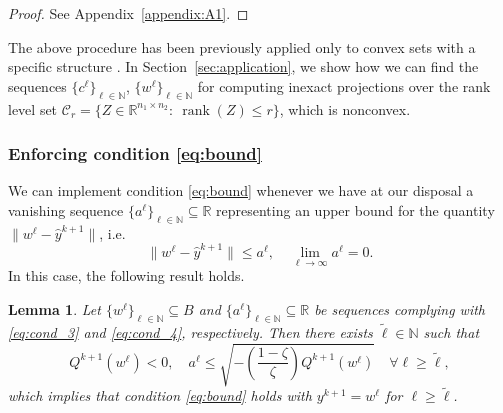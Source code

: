 \documentclass[pdflatex,sn-mathphys-num]{sn-jnl}
\numberwithin{equation}{section}%
\def\R{\mathbb{R}}
\def\N{\mathbb{N}}
\theoremstyle{thmstyleone}%
\newtheorem{lemma}[theorem]{Lemma}%
\theoremstyle{thmstyletwo}%
\theoremstyle{thmstylethree}%
\begin{document}
\begin{proof}
    See Appendix~\ref{appendix:A1}.
\end{proof}

The above procedure has been previously applied only to convex sets with a specific structure \cite{Birgin2003,Ferreira-2022}. In Section~\ref{sec:application}, we show how we can find the sequences $\{c^{\ell}\}_{\ell\in\N}$, $\{w^{\ell}\}_{\ell\in\N}$ for computing inexact projections over the rank level set $\mathcal{C}_r = \{Z\in\R^{n_1\times n_2}: \ \operatorname{rank}(Z)\leq r\}$, which is nonconvex.

\subsubsection{Enforcing condition \eqref{eq:bound}}
We can implement condition \eqref{eq:bound} whenever we have at our disposal a vanishing sequence $\{a^{\ell}\}_{\ell\in\N}\subseteq \R$ representing an upper bound for the quantity $\|w^{\ell}-\hat{y}^{k+1}\|$, i.e.
\begin{equation}\label{eq:cond_4}
    \|w^{\ell}-\hat{y}^{k+1}\|\leq a^{\ell}, \quad \lim_{\ell\rightarrow \infty}a^{\ell} = 0.  
\end{equation}
In this case, the following result holds.

\begin{lemma}\label{lem:stopping_2}
    Let $\{w^{\ell}\}_{\ell\in\N}\subseteq B$ and $\{a^{\ell}\}_{\ell\in\N}\subseteq \R$ be sequences complying with \eqref{eq:cond_3} and \eqref{eq:cond_4}, respectively.
    Then there exists $\tilde{\ell}\in\N$ such that
    \begin{equation}\label{eq:stopping_2}
        Q^{k+1}(w^{{\ell}})< 0, \quad a^{{\ell}}\leq \sqrt{-\left(\frac{1-\zeta}{\zeta}\right)Q^{k+1}(w^{{\ell}})} \quad \forall \ell\ge \tilde \ell,
    \end{equation}
    which implies that condition \eqref{eq:bound} holds with $y^{k+1} = w^{\ell}$ for $\ell\ge \tilde \ell$.
\end{lemma}
\end{document}
